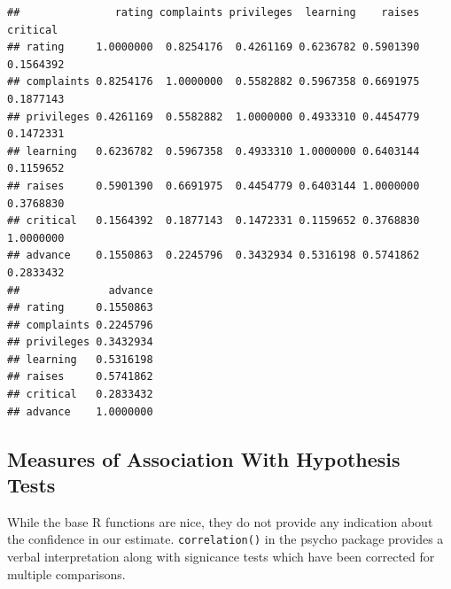 \documentclass[]{book}
\newenvironment{Shaded}{\begin{snugshade}}{\end{snugshade}}
\newcommand{\CommentTok}[1]{\textcolor[rgb]{0.56,0.35,0.01}{\textit{#1}}}
\newcommand{\KeywordTok}[1]{\textcolor[rgb]{0.13,0.29,0.53}{\textbf{#1}}}
\newcommand{\NormalTok}[1]{#1}
\newcommand{\OperatorTok}[1]{\textcolor[rgb]{0.81,0.36,0.00}{\textbf{#1}}}
\theoremstyle{definition}
\theoremstyle{definition}
\theoremstyle{definition}
\theoremstyle{remark}
\begin{document}
\begin{verbatim}
##               rating complaints privileges  learning    raises  critical
## rating     1.0000000  0.8254176  0.4261169 0.6236782 0.5901390 0.1564392
## complaints 0.8254176  1.0000000  0.5582882 0.5967358 0.6691975 0.1877143
## privileges 0.4261169  0.5582882  1.0000000 0.4933310 0.4454779 0.1472331
## learning   0.6236782  0.5967358  0.4933310 1.0000000 0.6403144 0.1159652
## raises     0.5901390  0.6691975  0.4454779 0.6403144 1.0000000 0.3768830
## critical   0.1564392  0.1877143  0.1472331 0.1159652 0.3768830 1.0000000
## advance    0.1550863  0.2245796  0.3432934 0.5316198 0.5741862 0.2833432
##              advance
## rating     0.1550863
## complaints 0.2245796
## privileges 0.3432934
## learning   0.5316198
## raises     0.5741862
## critical   0.2833432
## advance    1.0000000
\end{verbatim}

\hypertarget{measures-of-association-with-hypothesis-tests}{%
\subsection{Measures of Association With Hypothesis Tests}\label{measures-of-association-with-hypothesis-tests}}

While the base R functions are nice, they do not provide any indication about the confidence in our estimate. \texttt{correlation()} in the psycho package provides a verbal interpretation along with signicance tests which have been corrected for multiple comparisons.

\begin{Shaded}
\end{Shaded}
\end{document}
